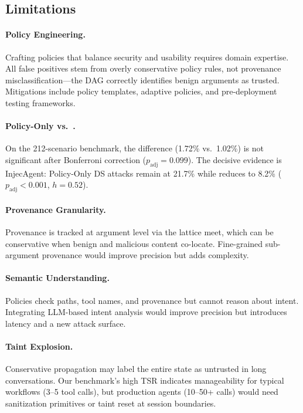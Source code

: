 \subsection{Limitations}

\paragraph{Policy Engineering.}
Crafting policies that balance security and usability requires domain expertise. All false positives stem from overly conservative policy rules, not provenance misclassification---the DAG correctly identifies benign arguments as trusted. Mitigations include policy templates, adaptive policies, and pre-deployment testing frameworks.

\paragraph{Policy-Only vs.\ \sys{}.}
On the 212-scenario benchmark, the difference (1.72\% vs.\ 1.02\%) is not significant after Bonferroni correction ($p_{\text{adj}} = 0.099$). The decisive evidence is InjecAgent: Policy-Only DS attacks remain at 21.7\% while \sys{} reduces to 8.2\% ($p_{\text{adj}} < 0.001$, $h = 0.52$).

\paragraph{Provenance Granularity.}
Provenance is tracked at argument level via the lattice meet, which can be conservative when benign and malicious content co-locate. Fine-grained sub-argument provenance would improve precision but adds complexity.

\paragraph{Semantic Understanding.}
Policies check paths, tool names, and provenance but cannot reason about intent. Integrating LLM-based intent analysis would improve precision but introduces latency and a new attack surface.

\paragraph{Taint Explosion.}
Conservative propagation may label the entire state as untrusted in long conversations. Our benchmark's high TSR indicates manageability for typical workflows (3--5 tool calls), but production agents (10--50+ calls) would need sanitization primitives or taint reset at session boundaries.


